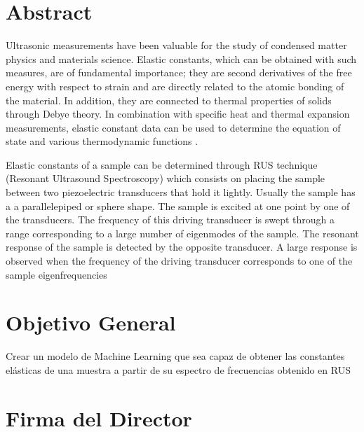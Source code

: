 \documentclass[12pt]{article}
\begin{document}



\section{Abstract}
Ultrasonic measurements have been valuable for the study of condensed matter physics and materials science. Elastic constants, which can be obtained with such measures, are of fundamental importance; they are second derivatives of the free energy with respect to strain and are directly related to the atomic bonding of the material. In addition, they are connected to thermal properties of solids through Debye theory. In combination with specific heat and thermal expansion measurements, elastic constant data can be used to determine the equation of state and various thermodynamic functions \cite{Leisure_1997}.

Elastic constants of a sample can be determined through RUS technique (Resonant Ultrasound Spectroscopy) which consists on placing the sample between two piezoelectric transducers that hold it lightly. Usually the sample has a a parallelepiped or sphere shape. The sample is excited at one point by one of the transducers. The frequency of this driving transducer is swept through a range corresponding to a large number of eigenmodes of the sample. The resonant response of the sample is detected by the opposite transducer. A large response is observed when the frequency of the driving transducer corresponds to one of the sample eigenfrequencies \cite{Leisure_1997}
\section{Objetivo General}


Crear un modelo de Machine Learning que sea capaz de obtener las constantes elásticas de una muestra a partir de su espectro de frecuencias obtenido en RUS







\section*{Firma del Director}
\vspace{1.5cm}
\end{document}
